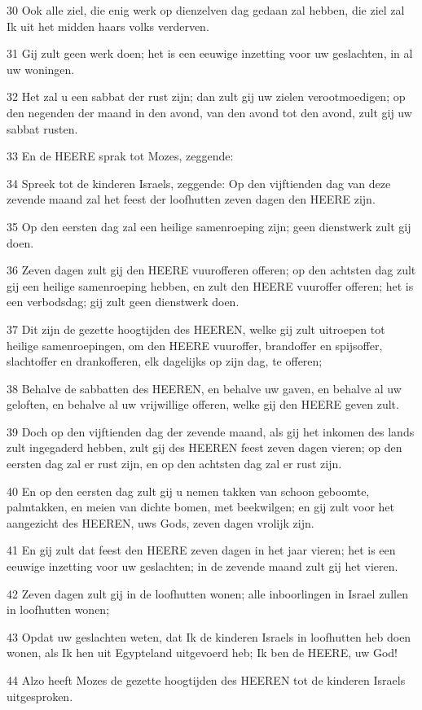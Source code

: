 \par 30 Ook alle ziel, die enig werk op dienzelven dag gedaan zal hebben, die ziel zal Ik uit het midden haars volks verderven.
\par 31 Gij zult geen werk doen; het is een eeuwige inzetting voor uw geslachten, in al uw woningen.
\par 32 Het zal u een sabbat der rust zijn; dan zult gij uw zielen verootmoedigen; op den negenden der maand in den avond, van den avond tot den avond, zult gij uw sabbat rusten.
\par 33 En de HEERE sprak tot Mozes, zeggende:
\par 34 Spreek tot de kinderen Israels, zeggende: Op den vijftienden dag van deze zevende maand zal het feest der loofhutten zeven dagen den HEERE zijn.
\par 35 Op den eersten dag zal een heilige samenroeping zijn; geen dienstwerk zult gij doen.
\par 36 Zeven dagen zult gij den HEERE vuurofferen offeren; op den achtsten dag zult gij een heilige samenroeping hebben, en zult den HEERE vuuroffer offeren; het is een verbodsdag; gij zult geen dienstwerk doen.
\par 37 Dit zijn de gezette hoogtijden des HEEREN, welke gij zult uitroepen tot heilige samenroepingen, om den HEERE vuuroffer, brandoffer en spijsoffer, slachtoffer en drankofferen, elk dagelijks op zijn dag, te offeren;
\par 38 Behalve de sabbatten des HEEREN, en behalve uw gaven, en behalve al uw geloften, en behalve al uw vrijwillige offeren, welke gij den HEERE geven zult.
\par 39 Doch op den vijftienden dag der zevende maand, als gij het inkomen des lands zult ingegaderd hebben, zult gij des HEEREN feest zeven dagen vieren; op den eersten dag zal er rust zijn, en op den achtsten dag zal er rust zijn.
\par 40 En op den eersten dag zult gij u nemen takken van schoon geboomte, palmtakken, en meien van dichte bomen, met beekwilgen; en gij zult voor het aangezicht des HEEREN, uws Gods, zeven dagen vrolijk zijn.
\par 41 En gij zult dat feest den HEERE zeven dagen in het jaar vieren; het is een eeuwige inzetting voor uw geslachten; in de zevende maand zult gij het vieren.
\par 42 Zeven dagen zult gij in de loofhutten wonen; alle inboorlingen in Israel zullen in loofhutten wonen;
\par 43 Opdat uw geslachten weten, dat Ik de kinderen Israels in loofhutten heb doen wonen, als Ik hen uit Egypteland uitgevoerd heb; Ik ben de HEERE, uw God!
\par 44 Alzo heeft Mozes de gezette hoogtijden des HEEREN tot de kinderen Israels uitgesproken.

